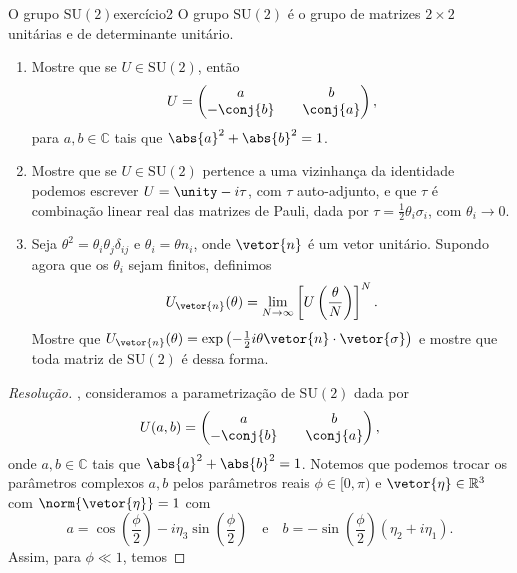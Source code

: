 \begin{exercício}{O grupo \(\mathrm{SU}(2)\)}{exercício2}
    O grupo \(\mathrm{SU}(2)\) é o grupo de matrizes \(2\times 2\) unitárias e de determinante unitário.
    \begin{enumerate}[label=(\alph*)]
        \item Mostre que se \(U \in \mathrm{SU}(2)\), então
            \begin{equation*}
                U = \begin{pmatrix}
                    a && b\\
                    -\conj{b} && \conj{a}
                \end{pmatrix},
            \end{equation*}
            para \(a,b \in \mathbb{C}\) tais que \(\abs{a}^2 + \abs{b}^2 = 1\).
        \item Mostre que se \(U \in \mathrm{SU}(2)\) pertence a uma vizinhança da identidade podemos escrever \(U = \unity - i \tau\), com \(\tau\) auto-adjunto, e que \(\tau\) é combinação linear real das matrizes de Pauli, dada por \(\tau = \frac12 \theta_i \sigma_i\), com \(\theta_i \to 0\).
        \item Seja \(\theta^2 = \theta_i \theta_j \delta_{ij}\) e \(\theta_i = \theta n_i\), onde \(\vetor{n}\) é um vetor unitário. Supondo agora que os \(\theta_i\) sejam finitos, definimos
            \begin{equation*}
                U_{\vetor{n}}(\theta) = \lim_{N\to \infty} \left[U\left(\frac{\theta}{N}\right)\right]^N.
            \end{equation*}
            Mostre que \(U_{\vetor{n}}(\theta) = \exp\left(-\frac12i\theta \vetor{n} \cdot \vetor{\sigma}\right)\) e mostre que toda matriz de \(\mathrm{SU}(2)\) é dessa forma.
    \end{enumerate}
\end{exercício}
\begin{proof}[Resolução]
    , consideramos a parametrização  de \(\mathrm{SU}(2)\) dada por
    \begin{equation*}
        U(a,b) = \begin{pmatrix}
            a && b\\
            -\conj{b}&&\conj{a}
        \end{pmatrix},
    \end{equation*}
    onde \(a,b \in \mathbb{C}\) tais que \(\abs{a}^2 + \abs{b}^2 = 1\). Notemos que podemos trocar os parâmetros complexos \(a,b\) pelos parâmetros reais \(\phi \in [0,\pi)\) e \(\vetor{\eta} \in \mathbb{R}^3\) com \(\norm{\vetor{\eta}} = 1\) com
    \begin{equation*}
        a = \cos\left(\frac{\phi}{2}\right) - i \eta_3 \sin\left(\frac{\phi}{2}\right)
        \quad\text{e}\quad
        b = -\sin\left(\frac{\phi}{2}\right)\left(\eta_2 + i\eta_1\right).
    \end{equation*}
    Assim, para \(\phi \ll 1\), temos
\end{proof}
